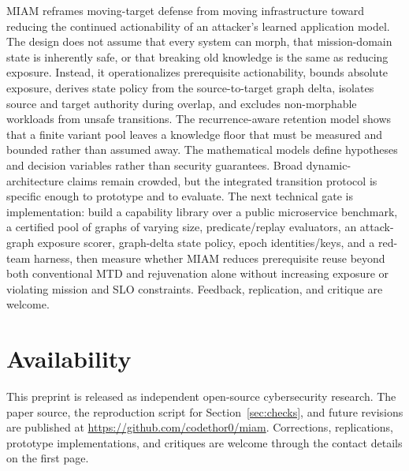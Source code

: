 \documentclass[11pt,letterpaper]{article}
\begin{document}
MIAM reframes moving-target defense from moving infrastructure toward reducing the continued actionability of an attacker's learned application model. The design does not assume that every system can morph, that mission-domain state is inherently safe, or that breaking old knowledge is the same as reducing exposure. Instead, it operationalizes prerequisite actionability, bounds absolute exposure, derives state policy from the source-to-target graph delta, isolates source and target authority during overlap, and excludes non-morphable workloads from unsafe transitions. The recurrence-aware retention model shows that a finite variant pool leaves a knowledge floor that must be measured and bounded rather than assumed away. The mathematical models define hypotheses and decision variables rather than security guarantees. Broad dynamic-architecture claims remain crowded, but the integrated transition protocol is specific enough to prototype and to evaluate. The next technical gate is implementation: build a capability library over a public microservice benchmark, a certified pool of graphs of varying size, predicate/replay evaluators, an attack-graph exposure scorer, graph-delta state policy, epoch identities/keys, and a red-team harness, then measure whether MIAM reduces prerequisite reuse beyond both conventional MTD and rejuvenation alone without increasing exposure or violating mission and SLO constraints. Feedback, replication, and critique are welcome.

\section*{Availability}

This preprint is released as independent open-source cybersecurity research. The paper source, the reproduction script for Section~\ref{sec:checks}, and future revisions are published at \url{https://github.com/codethor0/miam}. Corrections, replications, prototype implementations, and critiques are welcome through the contact details on the first page.
\end{document}
